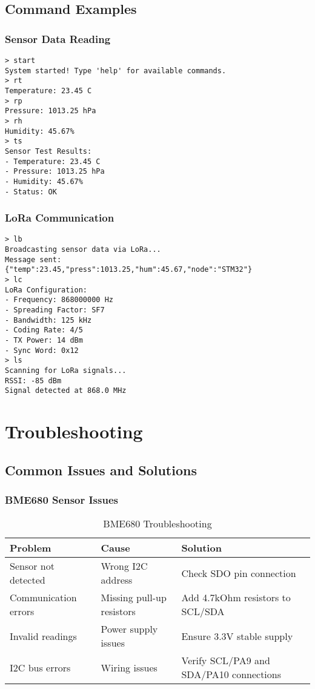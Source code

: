\documentclass[11pt,a4paper]{article}
\begin{document}
\subsection{Command Examples}

\subsubsection{Sensor Data Reading}
\begin{lstlisting}[caption=Reading Sensor Data]
> start
System started! Type 'help' for available commands.
> rt
Temperature: 23.45 C
> rp
Pressure: 1013.25 hPa
> rh
Humidity: 45.67%
> ts
Sensor Test Results:
- Temperature: 23.45 C
- Pressure: 1013.25 hPa
- Humidity: 45.67%
- Status: OK
\end{lstlisting}

\subsubsection{LoRa Communication}
\begin{lstlisting}[caption=LoRa Communication]
> lb
Broadcasting sensor data via LoRa...
Message sent: {"temp":23.45,"press":1013.25,"hum":45.67,"node":"STM32"}
> lc
LoRa Configuration:
- Frequency: 868000000 Hz
- Spreading Factor: SF7
- Bandwidth: 125 kHz
- Coding Rate: 4/5
- TX Power: 14 dBm
- Sync Word: 0x12
> ls
Scanning for LoRa signals...
RSSI: -85 dBm
Signal detected at 868.0 MHz
\end{lstlisting}

\section{Troubleshooting}

\subsection{Common Issues and Solutions}

\subsubsection{BME680 Sensor Issues}
\begin{table}[h]
\centering
\begin{tabular}{|l|l|l|}
\hline
\textbf{Problem} & \textbf{Cause} & \textbf{Solution} \\
\hline
Sensor not detected & Wrong I2C address & Check SDO pin connection \\
\hline
Communication errors & Missing pull-up resistors & Add 4.7kOhm resistors to SCL/SDA \\
\hline
Invalid readings & Power supply issues & Ensure 3.3V stable supply \\
\hline
I2C bus errors & Wiring issues & Verify SCL/PA9 and SDA/PA10 connections \\
\hline
\end{tabular}
\caption{BME680 Troubleshooting}
\end{table}
\end{document}
